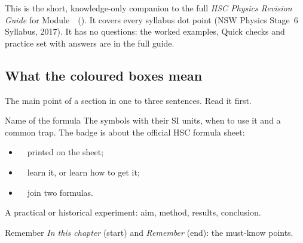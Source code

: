 \documentclass[11pt,a4paper,oneside,openany]{book}
\begin{document}
\makecover


This is the short, knowledge-only companion to the full \emph{HSC Physics Revision
Guide} for Module~\modulenumber\ (\moduletitle). It covers every syllabus dot point (NSW
Physics Stage~6 Syllabus, 2017). It has no questions: the worked examples, Quick checks
and practice set with answers are in the full guide.

\subsection*{What the coloured boxes mean}

\begin{sidebyside}[0.5]
  \begin{bigidea}[before skip=0pt, after skip=0pt, equal height group=esslegA, fontupper=\normalsize]
    The main point of a section in one to three sentences. Read it first.
  \end{bigidea}
\nextside
  \begin{keywords}[before skip=0pt, after skip=0pt, equal height group=esslegA]
  \end{keywords}
\end{sidebyside}

\begin{formulacard}[unbreakable, before skip=6pt, after skip=6pt]{Name of the formula}
  The symbols with their SI units, when to use it and a common trap. The badge is
  about the official HSC formula sheet:
  \begin{itemize}[itemsep=0pt, topsep=1pt]
    \item \hscbadgeonsheet\ \ printed on the sheet;
    \item \hscbadgenotonsheet\ \ learn it, or learn how to get it;
    \item {}\ \ join two formulas.
  \end{itemize}
\end{formulacard}

\begin{sidebyside}[0.5]
  \begin{experiment}[unbreakable, before skip=0pt, after skip=0pt, equal height group=esslegB]{}
    A practical or historical experiment: aim, method, results, conclusion.
  \end{experiment}
\nextside
  \begin{summarybox}[unbreakable, before skip=0pt, after skip=0pt, equal height group=esslegB]{Remember}
    \emph{In this chapter} (start) and \emph{Remember} (end): the must-know points.
  \end{summarybox}
\end{sidebyside}
\end{document}
